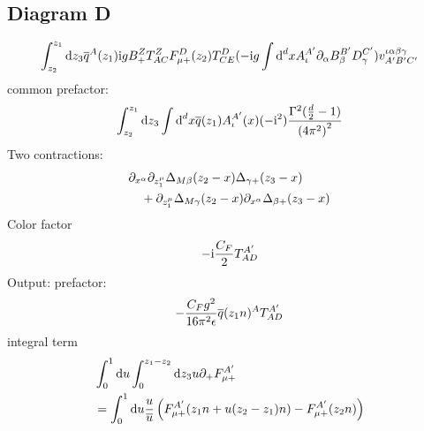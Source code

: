 \subsection{Diagram D}
\begin{align}
\int_{z_2}^{z_1} \text{d} z_3 \overline q^A(z_1) \text{i} g B_+^Z T^Z_{AC} F_{\mu +}^D(z_2) T^D_{CE}(-\text{i} g \int \text{d} ^d x A^{A'}_\iota \partial_\alpha B_\beta^{B'}D_\gamma^{C'})v^{\iota\alpha\beta\gamma}_{A'B'C'}
\end{align}
common prefactor:
\begin{align}
\int_{z_2}^{z_1} \text{d} z_3  \int \text{d} ^d x \overline q(z_1) A^{A'}_\iota(x)(-\text{i}^2)\frac{\Gamma^2(\frac{d}{2}-1)}{\left(4\pi^2\right)^{2}}
\end{align}
Two contractions:
\begin{align}
	&\partial_{x^\alpha} \partial_{z_1^\mu} \Delta_{M\beta}(z_2 -x) \Delta_{\gamma +}(z_3-x)
	\\&~~~
	+\partial_{z_1^\mu} \Delta_{M\gamma}(z_2 -x) \partial_{x^\alpha}\Delta_{\beta +}(z_3-x)
\end{align}
Color factor
\begin{align}
	-\text{i} \frac{C_F}{2} T^{A'}_{AD}
\end{align}
Output:
prefactor:
\begin{align}
	-\frac{C_F g^2}{16 \pi^2 \epsilon}\overline q(z_1n)^A T^{A'}_{AD}
\end{align}
integral term
\begin{align}
	&\int_0^1 \text{d} u \int_0^{z_1-z_2} \text{d} z_3 u \partial_+ F_{\mu +}^{A'} 
	\\
	&=\int _0^1 \text{d} u \frac{u}{\overline u} \left(F_{\mu +}^{A'}(z_1n+u(z_2-z_1)n)-F_{\mu +}^{A'}(z_2n)\right) 
\end{align}



